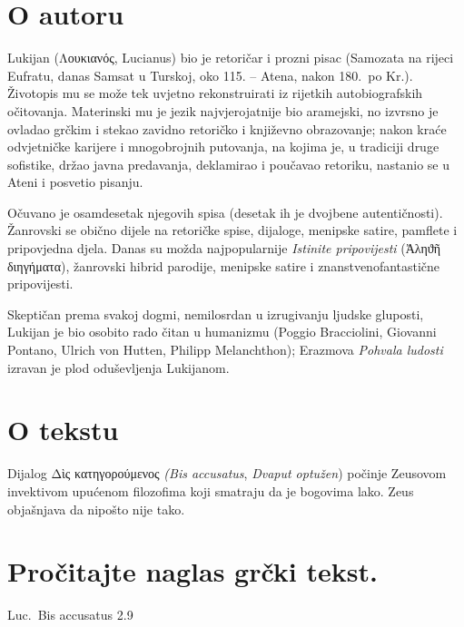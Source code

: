 \section*{O autoru}

Lukijan \textgreek[variant=ancient]{(Λουκιανός,} Lucianus) bio je retoričar i prozni pisac (Samozata na rijeci Eufratu, danas Samsat u Turskoj, oko 115. – Atena, nakon 180.\ po Kr.). Životopis mu se može tek uvjetno rekonstruirati iz rijetkih autobiografskih očitovanja. Materinski mu je jezik najvjerojatnije bio aramejski, no izvrsno je ovladao grčkim i stekao zavidno retoričko i književno obrazovanje; nakon kraće odvjetničke karijere i mnogobrojnih putovanja, na kojima je, u tradiciji druge sofistike, držao javna predavanja, deklamirao i poučavao retoriku, nastanio se u Ateni i posvetio pisanju.

Očuvano je osamdesetak njegovih spisa (desetak ih je dvojbene autentičnosti). Žanrovski se obično dijele na retoričke spise, dijaloge, menipske satire, pamflete i pripovjedna djela. Danas su možda najpopularnije \textit{Istinite pripovijesti} \textgreek[variant=ancient]{(Ἀληϑῆ διηγήματα),} žanrovski hibrid parodije, menipske satire i znanstvenofantastične pripovijesti.

Skeptičan prema svakoj dogmi, nemilosrdan u izrugivanju ljudske gluposti, Lukijan je bio osobito rado čitan u humanizmu (Poggio Bracciolini, Giovanni Pontano, Ulrich von Hutten, Philipp Melanchthon); Erazmova \textit{Pohvala ludosti} izravan je plod oduševljenja Lukijanom.

\section*{O tekstu}

Dijalog \textgreek[variant=ancient]{Δὶς κατηγορούμενος} \textit{(Bis accusatus}, \textit{Dvaput optužen}) počinje Zeusovom invektivom upućenom filozofima koji smatraju da je bogovima lako. Zeus objašnjava da nipošto nije tako.

\newpage

\section*{Pročitajte naglas grčki tekst.}

Luc.\ Bis accusatus 2.9

\medskip

